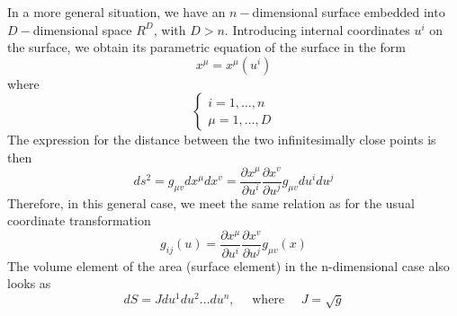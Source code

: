 In a more general situation, we have an $n-$dimensional surface embedded into $D-$dimensional space $R^D$, with $D>n$. Introducing internal coordinates $u^i$ on the surface, we obtain its parametric equation of the surface in the form
\begin{equation}
x^{\mu}=x^{\mu}\left(u^{i}\right)
\end{equation}
where
$$
\left\{\begin{array}{c}
{i=1, \ldots, n} \\
{\mu=1, \ldots, D}
\end{array}\right.
$$
The expression for the distance between the two infinitesimally close points is then
\begin{equation}
d s^{2}=g_{\mu v} d x^{\mu} d x^{v}=\frac{\partial x^{\mu}}{\partial u^{i}} \frac{\partial x^{v}}{\partial u^{j}} g_{\mu v} d u^{i} d u^{j}
\end{equation}
Therefore, in this general case, we meet the same relation as for the usual coordinate transformation
\begin{equation}
g_{i j}(u)=\frac{\partial x^{\mu}}{\partial u^{i}} \frac{\partial x^{v}}{\partial u^{j}} g_{\mu v}(x)
\end{equation}
 The volume element of the area (surface element) in the n-dimensional case also looks as
\begin{equation}
d S=J d u^{1} d u^{2} \ldots d u^{n}, \quad \text { where } \quad J=\sqrt{g}
\end{equation}

